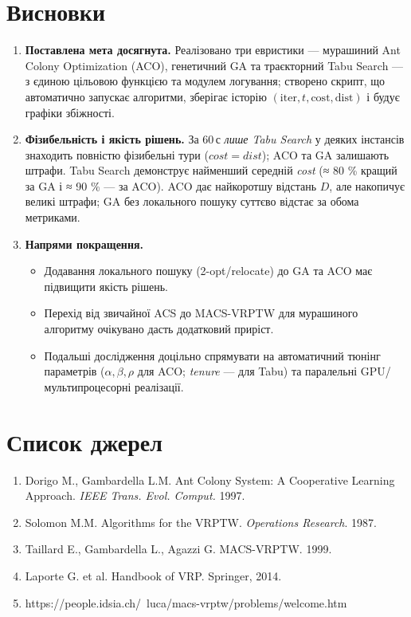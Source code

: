 \documentclass[12pt,a4paper]{article}
\begin{document}
\section{Висновки}
\begin{enumerate}
  \item \textbf{Поставлена мета досягнута.}  
        Реалізовано три евристики — мурашиний Ant Colony Optimization (ACO),
        генетичний GA та траєкторний Tabu Search — з єдиною цільовою
        функцією та модулем логування; створено скрипт, що
        автоматично запускає алгоритми, зберігає історію
        $(\text{iter},t,\text{cost},\text{dist})$ і будує графіки
        збіжності.

  \item \textbf{Фізибельність і якість рішень.}  
        За 60\,с \emph{лише Tabu Search} у деяких інстансів знаходить
        повністю фізибельні тури (\(cost = dist\)); ACO та GA залишають
        штрафи.  
        Tabu Search демонструє найменший середній \emph{cost}
        (≈ 80 \% кращий за GA і ≈ 90 \% — за ACO).  
        ACO дає найкоротшу відстань \(D\), але накопичує великі штрафи;
        GA без локального пошуку суттєво відстає за обома метриками.

  \item \textbf{Напрями покращення.}  
        \begin{itemize}
          \item Додавання локального пошуку (2-opt/relocate) до GA та
                ACO має підвищити якість рішень.
          \item Перехід від звичайної ACS до MACS-VRPTW для мурашиного
                алгоритму очікувано дасть додатковий приріст.
          \item Подальші дослідження доцільно спрямувати на
                автоматичний тюнінг параметрів
                ($\alpha,\beta,\rho$ для ACO; \textit{tenure} — для Tabu)
                та паралельні GPU/мультипроцесорні реалізації.
        \end{itemize}
\end{enumerate}

\section*{Список джерел}
\begin{enumerate}
  \item Dorigo M., Gambardella L.M. Ant Colony System: A Cooperative Learning Approach. \emph{IEEE Trans. Evol. Comput.} 1997.
  \item Solomon M.M. Algorithms for the VRPTW. \emph{Operations Research}. 1987.
  \item Taillard E., Gambardella L., Agazzi G. MACS-VRPTW. 1999.
  \item Laporte G. et al. Handbook of VRP. Springer, 2014.
  \item https://people.idsia.ch/~luca/macs-vrptw/problems/welcome.htm
\end{enumerate}
\end{document}
